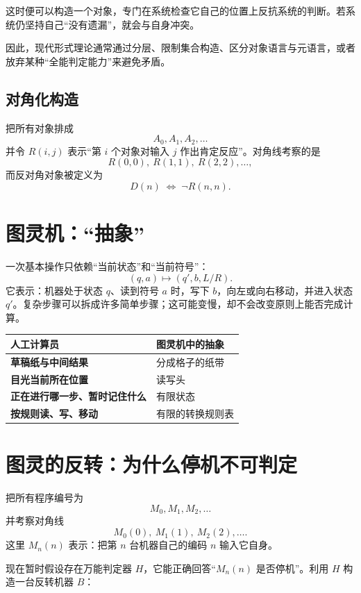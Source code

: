 \documentclass[11pt,a4paper]{article}
\begin{document}
这时便可以构造一个对象，专门在系统检查它自己的位置上反抗系统的判断。若系统仍坚持自己“没有遗漏”，就会与自身冲突。

因此，现代形式理论通常通过分层、限制集合构造、区分对象语言与元语言，或者放弃某种“全能判定能力”来避免矛盾。

\subsection{对角化构造}

把所有对象排成
\[
 A_0,A_1,A_2,\ldots
\]
并令 $R(i,j)$ 表示“第 $i$ 个对象对输入 $j$ 作出肯定反应”。对角线考察的是
\[
 R(0,0),\ R(1,1),\ R(2,2),\ldots,
\]
而反对角对象被定义为
\[
 D(n)\;\Longleftrightarrow\;\neg R(n,n).
\]


\section{图灵机：“抽象”}

一次基本操作只依赖“当前状态”和“当前符号”：
\[
  (q,a)\longmapsto(q',b,L/R).
\]
它表示：机器处于状态 $q$、读到符号 $a$ 时，写下 $b$，向左或向右移动，并进入状态 $q'$。复杂步骤可以拆成许多简单步骤；这可能变慢，却不会改变原则上能否完成计算。

\begin{center}
\renewcommand{\arraystretch}{1.35}
\begin{tabularx}{0.88\textwidth}{>{\bfseries}p{4.0cm} X}
\toprule
人工计算员 & 图灵机中的抽象 \\
\midrule
草稿纸与中间结果 & 分成格子的纸带 \\
目光当前所在位置 & 读写头 \\
正在进行哪一步、暂时记住什么 & 有限状态 \\
按规则读、写、移动 & 有限的转换规则表 \\
\bottomrule
\end{tabularx}
\end{center}




\section{图灵的反转：为什么停机不可判定}

把所有程序编号为
\[
 M_0,M_1,M_2,\ldots
\]
并考察对角线
\[
 M_0(0),\ M_1(1),\ M_2(2),\ldots.
\]
这里 $M_n(n)$ 表示：把第 $n$ 台机器自己的编码 $n$ 输入它自身。

现在暂时假设存在万能判定器 $H$，它能正确回答“$M_n(n)$ 是否停机”。利用 $H$ 构造一台反转机器 $B$：
\end{document}
